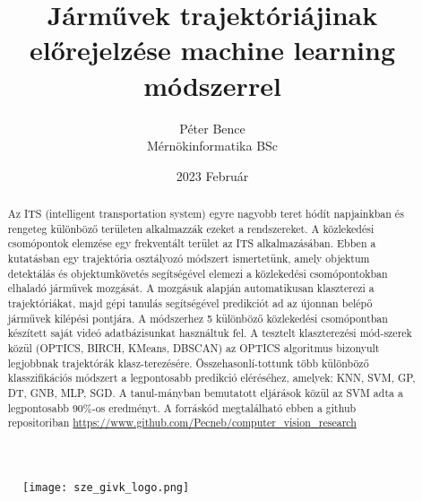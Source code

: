 \documentclass{article}
\title{Járművek trajektóriájinak előrejelzése machine learning módszerrel}
\author{Péter Bence\\Mérnökinformatika BSc}
\date{2023 Február}
\begin{document}
    
    \begin{titlepage}
        \maketitle
        \begin{figure}[H]\centering
            \texttt{[image: sze\_givk\_logo.png]}
        \end{figure}
    \end{titlepage}
    \begin{abstract}
        Az ITS (intelligent transportation system) egyre nagyobb teret 
        hódít napjainkban és rengeteg különböző területen alkalmazzák 
        ezeket a rendszereket. A közlekedési csomópontok elemzése egy 
        frekventált terület az ITS alkalmazásában. Ebben a kutatásban 
        egy trajektória osztályozó módszert ismertetünk, amely objektum 
        detektálás és objektumkövetés segítségével elemezi a közlekedési 
        csomópontokban elhaladó járművek mozgását. A mozgásuk alapján 
        automatikusan klaszterezi a trajektóriákat, majd gépi tanulás 
        segítségével predikciót ad az újonnan belépő járművek kilépési 
        pontjára. A módszerhez 5 különböző közlekedési csomópontban 
        készített saját videó adatbázisunkat használtuk fel.
        A tesztelt klaszterezési mód-szerek közül (OPTICS, BIRCH, KMeans, DBSCAN)
        az OPTICS algoritmus bizonyult legjobbnak trajektórák klasz-terezésére.
        Összehasonlí-tottunk több különböző klasszifikációs módszert 
        a legpontosabb predikció eléréséhez, amelyek: KNN, SVM, GP, DT, 
        GNB, MLP, SGD. A tanul-mányban bemutatott eljárások közül az 
        SVM adta a legpontosabb 90\%-os eredményt.
        A forráskód megtalálható ebben a github repositoriban 
        \url{https://www.github.com/Pecneb/computer_vision_research}
        

\end{abstract}
\end{document}
